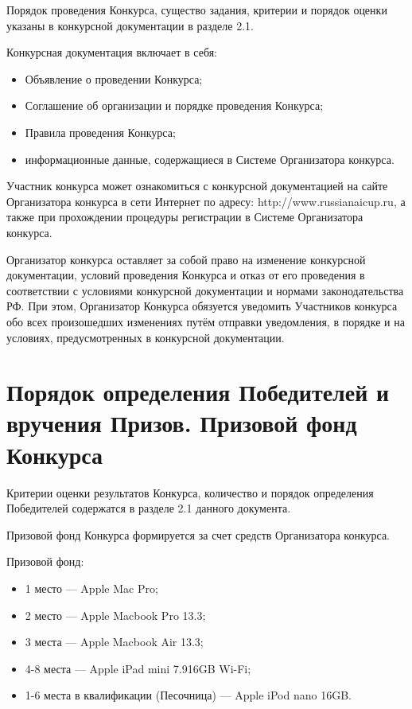 Порядок проведения Конкурса, существо задания, критерии и порядок оценки указаны в конкурсной документации в разделе 2.1.

Конкурсная документация включает в себя:
\begin{itemize}
\item Объявление о проведении Конкурса;
\item Соглашение об организации и порядке проведения Конкурса;
\item Правила проведения Конкурса;
\item информационные данные, содержащиеся в Системе Организатора конкурса.
\end{itemize}

Участник конкурса может ознакомиться с конкурсной документацией на сайте Организатора конкурса в сети Интернет по адресу:
http://www.russianaicup.ru, а также при прохождении процедуры регистрации в Системе Организатора конкурса.

Организатор конкурса оставляет за собой право на изменение конкурсной документации, условий проведения Конкурса и отказ от его проведения в
соответствии с условиями конкурсной документации и нормами законодательства РФ. При этом, Организатор Конкурса обязуется уведомить
Участников конкурса обо всех произошедших изменениях путём отправки уведомления, в порядке и на условиях, предусмотренных в конкурсной
документации.

\section{Порядок определения Победителей и вручения Призов. Призовой фонд Конкурса}

Критерии оценки результатов Конкурса, количество и порядок определения Победителей содержатся в разделе 2.1 данного документа.

Призовой фонд Конкурса формируется за счет средств Организатора конкурса.

Призовой фонд:
\begin{itemize}
\item 1 место --- Apple Mac Pro;
\item 2 место --- Apple Macbook Pro 13.3\textquotedbl;
\item 3 места --- Apple Macbook Air 13.3\textquotedbl;
\item 4-8 места --- Apple iPad mini 7.9\textquotedbl 16GB Wi-Fi;
\item 1-6 места в квалификации (Песочница) --- Apple iPod nano 16GB.
\end{itemize}

